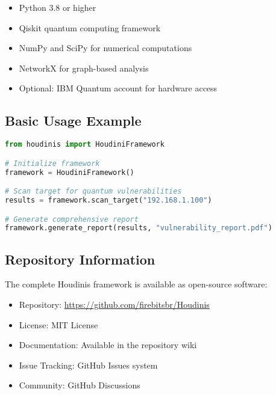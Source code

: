 \documentclass[11pt]{article}
\begin{document}
\begin{itemize}
\item Python 3.8 or higher
\item Qiskit quantum computing framework
\item NumPy and SciPy for numerical computations
\item NetworkX for graph-based analysis
\item Optional: IBM Quantum account for hardware access
\end{itemize}

\subsection{Basic Usage Example}

\begin{lstlisting}[language=Python, caption=Basic Houdinis Usage]
from houdinis import HoudiniFramework

# Initialize framework
framework = HoudiniFramework()

# Scan target for quantum vulnerabilities
results = framework.scan_target("192.168.1.100")

# Generate comprehensive report
framework.generate_report(results, "vulnerability_report.pdf")
\end{lstlisting}

\subsection{Repository Information}

The complete Houdinis framework is available as open-source software:

\begin{itemize}
\item Repository: \url{https://github.com/firebitsbr/Houdinis}
\item License: MIT License
\item Documentation: Available in the repository wiki
\item Issue Tracking: GitHub Issues system
\item Community: GitHub Discussions
\end{itemize}
\end{document}
